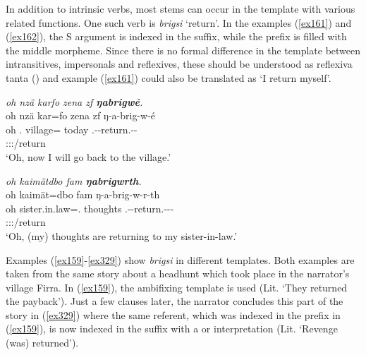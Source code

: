 In addition to intrinsic  verbs, most  stems can occur in the  template with various related functions. One such verb is \emph{brigsi} `return'. In the examples (\ref{ex161}) and (\ref{ex162}), the S argument is indexed in the suffix, while the prefix is filled with the middle morpheme. Since there is no formal difference in the  template between intransitives, impersonals and reflexives, these should be understood as reflexiva tanta (\citealt{Geniusienie:1987refl}) and example (\ref{ex161}) could also be translated as `I return myself'.

\begin{exe}
	\ex \emph{oh nzä karfo zena zf \textbf{ŋabrigwé}.}\\
	\glll oh nzä kar=fo zena zf ŋ-a-brig-w-é\\
	oh \Fsg.\Abs{} village=\All{} today \Imm{} \M.\Alph-\Vc-return.\Ext-\Ndu-\Fsg\\
	{} {} {} {} {} \footnotesize{\Fsg:\Sbj:\Nonpast:\Ipfv/return}\\
	\trans `Oh, now I will go back to the village.' 
	\label{ex161}
\end{exe}
\begin{exe}
	\ex \emph{oh kaimätdbo fam \textbf{ŋabrigwrth}.}\\
	\glll oh kaimät=dbo fam ŋ-a-brig-w-r-th\\
	oh sister.in.law=\All.\Anim{} thoughts \M.\Alph-\Vc-return.\Ext-\Ndu-\Lk-\Stnsg\\
	{} {} {} \footnotesize{\Stpl:\Sbj:\Nonpast:\Ipfv/return}\\
	\trans `Oh, (my) thoughts are returning to my sister-in-law.' 
	\label{ex162}
\end{exe}

Examples (\ref{ex159}-\ref{ex329}) show \emph{brigsi} in different templates. Both examples are taken from the same story about a headhunt which took place in the narrator's village Firra. In (\ref{ex159}), the ambifixing  template is used (Lit. `They returned the payback'). Just a few clauses later, the narrator concludes this part of the story in (\ref{ex329}) where the same referent, which was indexed in the prefix in (\ref{ex159}), is now indexed in the suffix with a  or  interpretation (Lit. `Revenge (was) returned').

